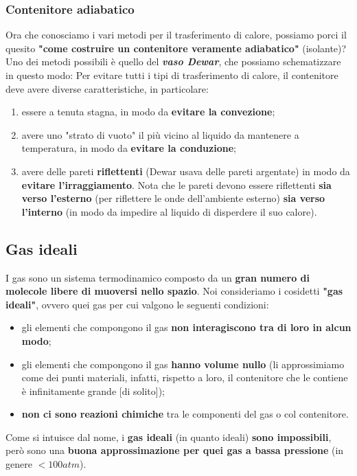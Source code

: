        \subsubsection{Contenitore adiabatico}
            Ora che conosciamo i vari metodi per il trasferimento di calore, possiamo porci il quesito \textbf{"come costruire un contenitore veramente adiabatico"} (isolante)? Uno dei metodi possibili è quello del \textbf{\textit{vaso Dewar}}, che possiamo schematizzare in questo modo:
            Per evitare tutti i tipi di trasferimento di calore, il contenitore deve avere diverse caratteristiche, in particolare:
            \begin{enumerate}
                \item essere a tenuta stagna, in modo da \textbf{evitare la convezione};
                \item avere uno "strato di vuoto" il più vicino al liquido da mantenere a temperatura, in modo da \textbf{evitare la conduzione};
                \item avere delle pareti \textbf{riflettenti} (Dewar usava delle pareti argentate) in modo da \textbf{evitare l'irraggiamento}. Nota che le pareti devono essere riflettenti \textbf{sia verso l'esterno} (per riflettere le onde dell'ambiente esterno) \textbf{sia verso l'interno} (in modo da impedire al liquido di disperdere il suo calore).
            \end{enumerate}

    \subsection{Gas ideali}
        I gas sono un sistema termodinamico composto da un \textbf{gran numero di molecole libere di muoversi nello spazio}. Noi consideriamo i cosidetti \textbf{"gas ideali"}, ovvero quei gas per cui valgono le seguenti condizioni:
        \begin{itemize}
          \item gli elementi che compongono il gas \textbf{non interagiscono tra di loro in alcun modo};
          \item gli elementi che compongono il gas \textbf{hanno volume nullo} (li approssimiamo come dei punti materiali, infatti, rispetto a loro, il contenitore che le contiene è infinitamente grande [di solito]);
          \item \textbf{non ci sono reazioni chimiche} tra le componenti del gas o col contenitore.
        \end{itemize}
        Come si intuisce dal nome, i \textbf{gas ideali} (in quanto ideali) \textbf{sono impossibili}, però sono una \textbf{buona approssimazione per quei gas a bassa pressione} (in genere $< 100 atm$).

